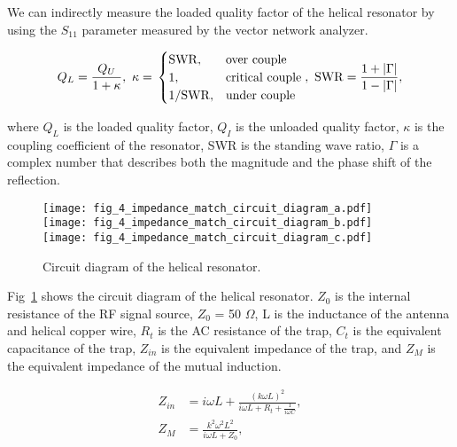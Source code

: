 We can indirectly measure the loaded quality factor of the helical resonator by using the ${S}_{11}$ parameter measured by the vector network analyzer.

\begin{equation}
    Q_L = \frac{Q_U}{1 + \kappa},\ \kappa =\\
    \begin{cases}
        \mathrm{SWR},     & \text{over couple}     \\
        1,                & \text{critical couple} \\
        1 / \mathrm{SWR}, & \text{under couple}    \\
    \end{cases}
    ,\ \mathrm{SWR} = \frac{1 + |\Gamma|}{1 - |\Gamma|},
\end{equation}

where $Q_L$ is the loaded quality factor, $Q_I$ is the unloaded quality factor, $\kappa$ is the coupling coefficient of the resonator, SWR is the standing wave ratio, $\Gamma$ is a complex number that describes both the magnitude and the phase shift of the reflection.

\begin{figure}
    \centering
    \subcaptionbox{\label{fig:fig_4_impedance_match_circuit_diagram_a}}
    {\texttt{[image: fig\_4\_impedance\_match\_circuit\_diagram\_a.pdf]}}
    \subcaptionbox{\label{fig:fig_4_impedance_match_circuit_diagram_b}}
    {\texttt{[image: fig\_4\_impedance\_match\_circuit\_diagram\_b.pdf]}}
    \subcaptionbox{\label{fig:fig_4_impedance_match_circuit_diagram_c}}
    {\texttt{[image: fig\_4\_impedance\_match\_circuit\_diagram\_c.pdf]}}
    \caption{Circuit diagram of the helical resonator.}
    \label{fig:fig_4_impedance_match_circuit_diagram}
\end{figure}

Fig~\ref{fig:fig_4_impedance_match_circuit_diagram} shows the circuit diagram of the helical resonator. $Z_0$ is the internal resistance of the RF signal source, $Z_0$ = 50 $\Omega$, L is the inductance of the antenna and helical copper wire, $R_t$ is the AC resistance of the trap, $C_t$ is the equivalent capacitance of the trap, $Z_{in}$ is the equivalent impedance of the trap, and $Z_M$ is the equivalent impedance of the mutual induction.

\begin{equation}
    \begin{aligned}
        Z_{in} & =i \omega L+\frac{(k \omega L)^2}{i \omega L+R_t+\frac{1}{i \omega C}}, \\
        Z_M    & =\frac{k^2 \omega^2 L^2}{i \omega L+Z_0},
    \end{aligned}
\end{equation}

